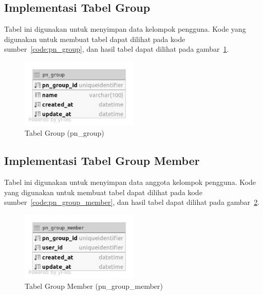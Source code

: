 \subsection{Implementasi Tabel Group}
\par Tabel ini digunakan untuk menyimpan data kelompok pengguna. Kode yang digunakan untuk membuat tabel dapat dilihat pada kode sumber~\ref{code:pn_group}, dan hasil tabel dapat dilihat pada gambar~\ref{tabel_pn_group}.

\begin{figure}[H]
    \centering\includegraphics[width=0.5\textwidth]{bab4/figures/tabel_pn_group.jpg}
    \caption{Tabel Group (pn\_group)}
    \label{tabel_pn_group}
\end{figure}

\subsection{Implementasi Tabel Group Member}
\par Tabel ini digunakan untuk menyimpan data anggota kelompok pengguna. Kode yang digunakan untuk membuat tabel dapat dilihat pada kode sumber~\ref{code:pn_group_member}, dan hasil tabel dapat dilihat pada gambar~\ref{tabel_pn_group_member}.

\begin{figure}[H]
    \centering\includegraphics[width=0.5\textwidth]{bab4/figures/tabel_pn_group_member.jpg}
    \caption{Tabel Group Member (pn\_group\_member)}
    \label{tabel_pn_group_member}
\end{figure}

